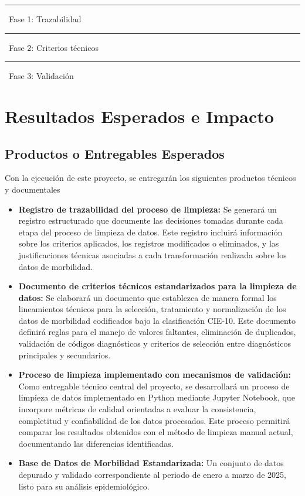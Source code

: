 \documentclass[12pt, letterpaper, oneside]{article}
\begin{document}
\vspace{4pt}
\noindent\footnotesize
\textcolor{fase1}{\rule{1em}{0.8em}}~Fase 1: Trazabilidad\quad
\textcolor{fase2}{\rule{1em}{0.8em}}~Fase 2: Criterios técnicos\quad
\textcolor{fase3}{\rule{1em}{0.8em}}~Fase 3: Validación


\newpage


\section{Resultados Esperados e Impacto}

\subsection{Productos o Entregables Esperados}
Con la ejecución de este proyecto, se entregarán los siguientes productos técnicos y documentales
\begin{itemize}
  \item \textbf{Registro de trazabilidad del proceso de limpieza:} Se generará un registro estructurado que documente las decisiones tomadas durante cada etapa del proceso de limpieza de datos. Este registro incluirá información sobre los criterios aplicados, los registros modificados o eliminados, y las justificaciones técnicas asociadas a cada transformación realizada sobre los datos de morbilidad.
  \item \textbf{Documento de criterios técnicos estandarizados para la limpieza de datos:} Se elaborará un documento que establezca de manera formal los lineamientos técnicos para la selección, tratamiento y normalización de los datos de morbilidad codificados bajo la clasificación CIE-10. Este documento definirá reglas para el manejo de valores faltantes, eliminación de duplicados, validación de códigos diagnósticos y criterios de selección entre diagnósticos principales y secundarios.
  \item \textbf{Proceso de limpieza implementado con mecanismos de validación:} Como entregable técnico central del proyecto, se desarrollará un proceso de limpieza de datos implementado en Python mediante Jupyter Notebook, que incorpore métricas de calidad orientadas a evaluar la consistencia, completitud y confiabilidad de los datos procesados. Este proceso permitirá comparar los resultados obtenidos con el método de limpieza manual actual, documentando las diferencias identificadas.
  \item \textbf{Base de Datos de Morbilidad Estandarizada:} Un conjunto de datos depurado y validado correspondiente al periodo de enero a marzo de 2025, listo para su análisis epidemiológico.
\end{itemize}
\end{document}
